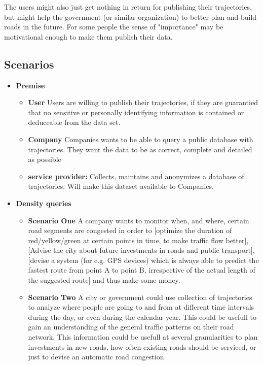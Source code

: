 The users might also just get nothing in return for publishing their trajectories, but might help the government (or
similar organization) to better plan and build roads in the future. For some people the sense of "importance" may 
be motivational enough to make them publish their data.



\subsection{Scenarios}
\begin{itemize}
	\item {\bf Premise}
	\begin{itemize}
		\item {\bf User} Users are willing to publish their trajectories, if they are guarantied that no sensitive
or personally identifying information is contained or deduceable from the data set.
		\item {\bf Company} Companies wants to be able to query a public database with trajectories. They want the data
to be as correct, complete and detailed as possible
		\item {\bf service provider:} Collects, maintains and anonymizes a database of trajectories. Will make this dataset 
available to Companies.
	\end{itemize}
	\item {\bf Density queries}
	\begin{itemize}
		\item {\bf Scenario One} A company wants to monitor when, and where, certain road segments are congested in order to
{[optimize the duration of red/yellow/green at certain points in time, to make traffic flow better],
[Advise the city about future investments in roads and public transport],
[devise a system (for e.g. GPS devices) which is always able to predict the fastest route from point A to point B, irrespective of the actual length of the suggested route]}
and thus make some money.
		\item {\bf Scenario Two} A city or government could use collection of trajectories to analyze where people are going 
to and from at different time intervals during the day, or even during the calendar year. This could be usefull to gain an 
understanding of the general traffic patterns on their road network. This information could be usefull at several granularities 
to plan investments in new roads, how often existing roads should be serviced, or just to devise an automatic road congestion 

\end{itemize}
\end{itemize}

